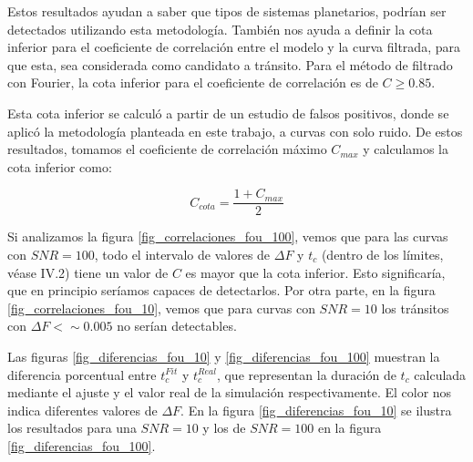 Estos resultados ayudan a saber que tipos de sistemas planetarios, podrían ser detectados utilizando esta metodología. También nos ayuda a definir la cota inferior para el coeficiente de correlación entre el modelo y la curva filtrada, para que esta, sea considerada como candidato a tránsito. Para el método de filtrado con Fourier, la cota inferior para el coeficiente de correlación es de $C \geq 0.85 $. 

Esta cota inferior se calculó a partir de un estudio de falsos positivos, donde se aplicó la metodología planteada en este trabajo, a curvas con solo ruido. De estos resultados, tomamos el coeficiente de correlación máximo $C_{max}$ y calculamos la cota inferior como: 

\begin{equation}
	C_{cota}= \dfrac{1+C_{max}}{2}
\end{equation}


Si analizamos la figura \ref{fig_correlaciones_fou_100}, vemos que para las curvas con $SNR=100$, todo el intervalo de valores de $\Delta F$ y $t_{c}$ (dentro de los límites, véase IV.2) tiene un valor de $C$ es mayor que la cota inferior. Esto significaría, que en principio seríamos capaces de detectarlos. Por otra parte, en la figura \ref{fig_correlaciones_fou_10}, vemos que para curvas con $SNR=10$ los tránsitos con $\Delta F < \sim 0.005$ no serían detectables.

Las figuras \ref{fig_diferencias_fou_10} y \ref{fig_diferencias_fou_100} muestran la diferencia porcentual entre $t_{c}^{Fit}$ y $t_{c}^{Real}$, que representan la duración de $t_{c}$ calculada mediante el ajuste y el valor real de la simulación respectivamente. El color nos indica diferentes valores de $\Delta F$. En la figura \ref{fig_diferencias_fou_10} se ilustra los resultados para una $SNR=10$ y los de $SNR=100$ en la figura \ref{fig_diferencias_fou_100}.


